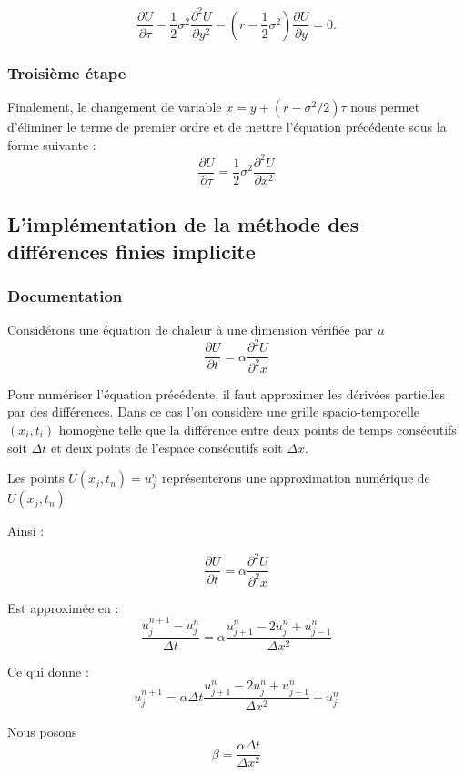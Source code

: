 \documentclass[a4paper, 12pt]{article}
\begin{document}
$$\frac{\partial U}{\partial \tau}-\frac{1}{2}\sigma^2\frac{\partial^2 U}{\partial y^2}-\left(r-\frac{1}{2}\sigma^2\right)\frac{\partial U}{\partial y}=0.$$

\subsubsection{Troisième étape}
Finalement, le changement de variable $x=y+(r-\sigma^2/2)\tau$ nous permet d'éliminer le terme de premier ordre et de mettre l'équation précédente sous la forme suivante :\\

$$\frac{\partial U}{\partial \tau}=\frac{1}{2}\sigma^2\frac{\partial^2 U}{\partial x^2}$$

\subsection{L'implémentation de la méthode des différences finies implicite}
\subsubsection{Documentation}
Considérons une équation de chaleur à une dimension vérifiée par $u$\\

$$\frac{\partial U}{\partial t}=\alpha \frac{\partial^2 U}{\partial^2 x}$$

Pour numériser l'équation précédente, il faut approximer les dérivées partielles par des différences. Dans ce cas l'on considère une grille spacio-temporelle $(x_i,t_i)$ homogène telle que la différence entre deux points de temps consécutifs soit $\Delta{t}$ et deux points de l'espace consécutifs soit $\Delta{x}$.

Les points $U(x_j,t_n)=u^n_j$ représenterons une approximation numérique de $U(x_j,t_n)$

Ainsi :

$$\frac{\partial U}{\partial t}=\alpha \frac{\partial^2 U}{\partial^2 x}$$

Est approximée en :\\ 

$$\frac{u^{n+1}_j-u^n_j}{\Delta{t}}=\alpha \frac{u^n_{j+1}-2u^n_j+u^n_{j-1}}{\Delta{x}^2}$$

Ce qui donne :\\ 

$$u^{n+1}_j=\alpha \Delta{t} \frac{u^n_{j+1}-2u^n_j+u^n_{j-1}}{\Delta{x}^2}+u^n_j$$

Nous posons $$\beta = \frac{\alpha \Delta{t}}{\Delta{x}^2}$$\\
\end{document}
